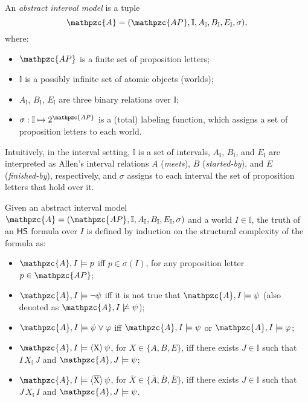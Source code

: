 \begin{definition}\label{def:AIM}
An \emph{abstract interval model} is a tuple \[\mathpzc{A}=(\mathpzc{AP},\mathbb{I},A_\mathbb{I},B_\mathbb{I},E_\mathbb{I},\sigma),\] where:
\begin{itemize}
    \item $\mathpzc{AP}$ is a finite set of proposition letters;
    \item $\mathbb{I}$ is a possibly infinite set of atomic objects (worlds);
    \item $A_\mathbb{I}$, $B_\mathbb{I}$, $E_\mathbb{I}$ are three binary relations over $\mathbb{I}$;
    \item $\sigma:\mathbb{I}\mapsto 2^{\mathpzc{AP}}$ is a (total) labeling function, which assigns a set of proposition letters to each world.
\end{itemize}
\end{definition}
Intuitively, in the interval setting, $\mathbb{I}$ is a set of intervals, $A_\mathbb{I}$, $B_\mathbb{I}$, and $E_\mathbb{I}$ are interpreted as Allen's interval relations $A$ (\emph{meets}), $B$
(\emph{started-by}), and $E$ (\emph{finished-by}), respectively, and $\sigma$ assigns to each interval the set of proposition letters that hold over it.

\begin{definition}[$\HS$ semantics]\label{def:satisfaction}
Given an abstract interval model $\mathpzc{A}=(\mathpzc{AP},\mathbb{I},A_\mathbb{I},B_\mathbb{I},E_\mathbb{I}, \sigma)$
and a world $I\in\mathbb{I}$, the truth of an $\HS$ formula over $I$ is defined by induction on the structural complexity of the formula as:
\begin{itemize}
    \item $\mathpzc{A},I\models p$ iff $p\in \sigma(I)$, for any proposition letter $p\in\mathpzc{AP}$;
    \item $\mathpzc{A},I\models \neg\psi$ iff it is not true that $\mathpzc{A},I\models \psi$ (also denoted as $\mathpzc{A},I\not\models \psi$);
        \item $\mathpzc{A},I\models \psi \vee \varphi$ iff $\mathpzc{A},I\models \psi$ or $\mathpzc{A},I\models \varphi$;
    \item $\mathpzc{A},I\models \hsX\psi$, for $X \in\{A,B,E\}$, iff there exists $J\in\mathbb{I}$ such that $I\, X_\mathbb{I}\, J$ and $\mathpzc{A},J\models \psi$;
    \item $\mathpzc{A},I\models \hsXt\psi$, for $\overline{X} \in\{\overline{A},\overline{B},\overline{E}\}$, iff there exists $J\in\mathbb{I}$ such that $J\, X_\mathbb{I}\, I$ and $\mathpzc{A},J\models \psi$.
\end{itemize}
\end{definition}

